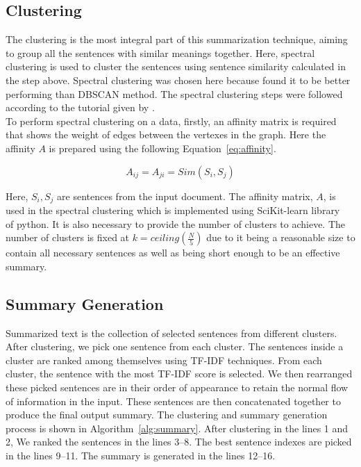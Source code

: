 \subsection{Clustering}\label{subsec:clustering}
The clustering is the most integral part of this summarization technique, aiming to group all the
sentences with similar meanings together.
Here, spectral clustering is used to cluster the sentences using sentence similarity calculated in the step above.
Spectral clustering was chosen here because \citeauthor{roychowdhury-etal-2022-spectral-base}
\cite{roychowdhury-etal-2022-spectral-base} found it to be better performing than DBSCAN method.
The spectral clustering steps were followed according to the tutorial given by
\cite{vonLuxburg-2007-spectral-tutorial}. \\

To perform spectral clustering on a data, firstly, an affinity matrix is required that shows
the weight of edges between the vertexes in the graph.
Here the affinity $A$ is prepared using the following Equation~\ref{eq:affinity}.

\begin{equation}\label{eq:affinity}
    A_{ij}=A_{ji}=Sim(S_i,S_j)
\end{equation}

Here, $S_i, S_j$ are sentences from the input document.
The affinity matrix, $A$, is used in the spectral clustering which is implemented using
SciKit-learn library~\cite{Pedregosa-2011-scikit-learn} of python.
It is also necessary to provide the number of clusters to achieve.
The number of clusters is fixed at $k=ceiling\left(\frac{N}{5}\right)$ due to it being a
reasonable size to contain all necessary sentences as well as being short enough to be an effective summary.

\subsection{Summary Generation}\label{subsec:summary-generation}
Summarized text is the collection of selected sentences from different clusters.
After clustering, we pick one sentence from each cluster.
The sentences inside a cluster are ranked among themselves using TF-IDF techniques.
From each cluster, the sentence with the most TF-IDF score is selected.
We then rearranged these picked sentences are in their order of appearance to retain the normal flow of
information in the input.
These sentences are then concatenated together to produce the final output summary.
The clustering and summary generation process is shown in Algorithm~\ref{alg:summary}.
After clustering in the lines 1 and 2, We ranked the sentences in the lines 3--8.
The best sentence indexes are picked in the lines 9--11.
The summary is generated in the lines 12--16.

